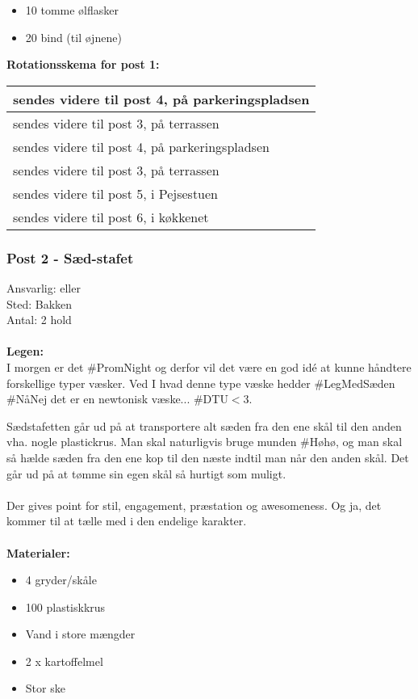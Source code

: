 \begin{multicols}{2}
\begin{itemize}
\item 10 tomme ølflasker
\item 20 bind (til øjnene)
\end{itemize}
\end{multicols}

\textbf{Rotationsskema for post 1:}\\
\begin{tabular}{ | l | }
\hline
	 \Hippier sendes videre til post 4, \Johnny på parkeringspladsen \\ \hline
	 \Norder sendes videre til post 3, \Ora på terrassen \\ \hline
	 \Bad sendes videre til post 4, \Johnny på parkeringspladsen \\ \hline
	 \Poppere sendes videre til post 3, \Ora på terrassen \\ \hline
	 \Alternative sendes videre til post 5, \KABS i Pejsestuen \\ \hline
	 \Fransk sendes videre til post 6, \Hyttebombz{} i køkkenet \\ \hline
\end{tabular}

\newpage

\subsubsection{Post 2 - Sæd-stafet}
Ansvarlig: 	\Lucyfar eller \Gabriel\\
Sted: Bakken \\
Antal: 2 hold \\\\
\textbf{Legen:}\\
I morgen er det \#PromNight og derfor vil det være en god idé at kunne håndtere forskellige typer væsker.
Ved I hvad denne type væske hedder \#LegMedSæden \#NåNej det er en newtonisk væske... \#DTU$<$3.

Sædstafetten går ud på at transportere alt sæden fra den ene skål til den anden vha. nogle plastickrus. Man skal naturligvis bruge munden \#Høhø, og man skal så hælde sæden fra den ene kop til den næste indtil man når den anden skål. Det går ud på at tømme sin egen skål så hurtigt som muligt.\\\\
Der gives point for stil, engagement, præstation og awesomeness. Og ja, det kommer til at tælle med i den endelige karakter.\\\\
\textbf{Materialer:}
\begin{multicols}{2}
\begin{itemize}
\item 4 gryder/skåle
\item 100 plastiskkrus
\item Vand i store mængder
\item 2 x kartoffelmel
\item Stor ske
\end{itemize}
\end{multicols}

